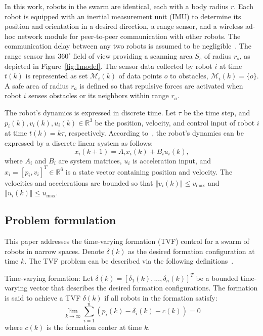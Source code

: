 In this work, robots in the swarm are identical, each with a body radius $r$. Each robot is equipped with an inertial measurement unit (IMU) to determine its position and orientation in a desired direction, a range sensor, and a wireless ad-hoc network module for peer-to-peer communication with other robots. The communication delay between any two robots is assumed to be negligible~\cite{AlonsoMora2018,9527169}. The range sensor has $360^\circ$ field of view providing a scanning area $S_s$ of radius $r_s$, as depicted in Figure~\ref{fig:1model}. The sensor data collected by robot $i$ at time $t(k)$ is represented as set $\mathcal{M}_i(k)$ of data points $o$ to obstacles, $\mathcal{M}_i(k) = \{o\}$. A safe area of radius $r_a$ is defined so that repulsive forces are activated when robot $i$ senses obstacles or its neighbors within range $r_a$.

The robot's dynamics is expressed in discrete time. Let $\tau$ be the time step, and $p_i(k), v_i(k), u_i(k) \in \mathbb{R}^3$  be the position, velocity, and control input of robot $i$ at time $t(k) = k\tau$, respectively. According to~\cite{Dong2015}, the robot's dynamics can be expressed by a discrete linear system as follows:
\begin{equation}
    x_i(k+1)=A_ix_i(k) + B_iu_i(k),
    \label{eqn:1model}
\end{equation}
where $A_i$ and $B_i$ are system matrices, $u_i$ is  acceleration input, and  $x_i=\left[p_i,v_i\right]^T\in\mathbb{R}^6$ is a state vector containing position and velocity. The velocities and accelerations are bounded so that $\left\Vert v_i(k)\right\Vert\leq v_\text{max}$ and $\left\Vert u_i(k)\right\Vert\leq u_\text{max}$.

\subsection{Problem formulation}

This paper addresses the time-varying formation (TVF) control for a swarm of robots in narrow spaces. Denote $\delta(k)$ as the desired formation configuration at time $k$. The TVF problem can be described via the following definitions~\cite{Dong2015,Dong2016}.

\begin{definition}\label{def_tvf}
Time-varying formation:  Let $\delta(k)=\left[\delta_1(k),...,\delta_n(k)\right]^T$ be a bounded time-varying vector that describes the desired formation configurations. The formation is said to achieve a TVF $\delta(k)$ if all robots in the formation satisfy:
\begin{equation}
    \lim_{k\to\infty}\sum_{i=1}^n\left( p_i(k)-\delta_i(k)-c(k)\right)=0
\end{equation}
where $c(k)$ is the formation center at time $k$.
\end{definition}

